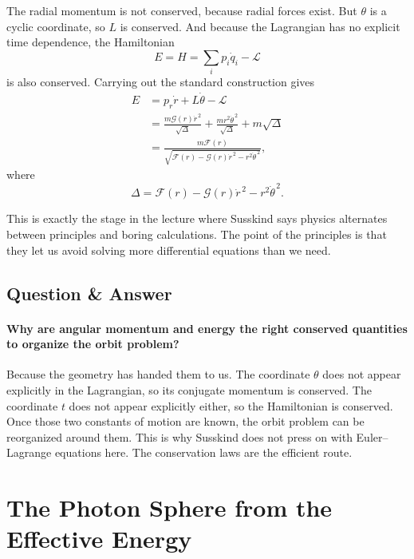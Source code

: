 The radial momentum is not conserved, because radial forces exist. But \(\theta\) is a cyclic coordinate, so \(L\) is conserved. And because the Lagrangian has no explicit time dependence, the Hamiltonian
\begin{equation}
E=H=\sum_{i}p_{i}\dot q_{i}-\mathcal L
\end{equation}
is also conserved. Carrying out the standard construction gives
\begin{align}
E
&=
p_{r}\dot r+L\dot\theta-\mathcal L \\
&=
\frac{m\mathcal G(r)\dot r^{\,2}}{\sqrt{\Delta}}
+
\frac{mr^{2}\dot\theta^{\,2}}{\sqrt{\Delta}}
+
m\sqrt{\Delta} \\
&=
\frac{m\mathcal F(r)}
{\sqrt{\mathcal F(r)-\mathcal G(r)\dot r^{\,2}-r^{2}\dot\theta^{\,2}}},
\end{align}
where
\begin{equation}
\Delta=\mathcal F(r)-\mathcal G(r)\dot r^{\,2}-r^{2}\dot\theta^{\,2}.
\end{equation}

This is exactly the stage in the lecture where Susskind says physics alternates between principles and boring calculations. The point of the principles is that they let us avoid solving more differential equations than we need.

\subsection{Question \& Answer}

\paragraph{Why are angular momentum and energy the right conserved quantities to organize the orbit problem?}

Because the geometry has handed them to us. The coordinate \(\theta\) does not appear explicitly in the Lagrangian, so its conjugate momentum is conserved. The coordinate \(t\) does not appear explicitly either, so the Hamiltonian is conserved. Once those two constants of motion are known, the orbit problem can be reorganized around them. This is why Susskind does not press on with Euler--Lagrange equations here. The conservation laws are the efficient route.

\section{The Photon Sphere from the Effective Energy}

